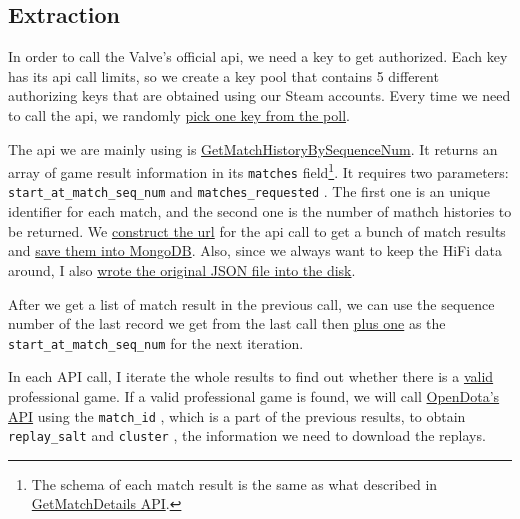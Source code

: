 \documentclass{article}
\newcommand{\codeinline}[1]{
    \texttt{#1}
}
\begin{document}
\subsection{Extraction}

In order to call the Valve's official api, we need a key to get authorized. Each key has its api call limits, so we create a key pool that contains 5 different authorizing keys that are obtained using our Steam accounts. Every time we need to call the api, we randomly \href{https://github.com/Vopaaz/big-data-psg-lgd/blob/a9a285e0e29c0d9e56b41994875df830c7e7b51b/src/main/java/FetchStore/ValveAPI.java#L215}{pick one key from the poll}.

The api we are mainly using is \href{https://wiki.teamfortress.com/wiki/WebAPI/GetMatchHistoryBySequenceNum}{GetMatchHistoryBySequenceNum}. It returns an array of game result information in its \codeinline{matches} field\footnote{The schema of each match result is the same as what described in \href{https://wiki.teamfortress.com/wiki/WebAPI/GetMatchDetails}{GetMatchDetails API}.}. It requires two parameters:\codeinline{start_at_match_seq_num} and \codeinline{matches_requested}.
The first one is an unique identifier for each match, and the second one is the number of mathch histories to be returned. We \href{https://github.com/Vopaaz/big-data-psg-lgd/blob/a9a285e0e29c0d9e56b41994875df830c7e7b51b/src/main/java/FetchStore/ValveAPI.java#L207-L230}{construct the url} for the api call to get a bunch of match results and \href{https://github.com/Vopaaz/big-data-psg-lgd/blob/a9a285e0e29c0d9e56b41994875df830c7e7b51b/src/main/java/FetchStore/ValveAPI.java#L238-L257}{save them into MongoDB}.
Also, since we always want to keep the HiFi data around, I also \href{https://github.com/Vopaaz/big-data-psg-lgd/blob/a9a285e0e29c0d9e56b41994875df830c7e7b51b/src/main/java/FetchStore/ValveAPI.java#L289-L300}{wrote the original JSON file into the disk}.

After we get a list of match result in the previous call, we can use the sequence number of the last record we get from the last call then \href{https://github.com/Vopaaz/big-data-psg-lgd/blob/a9a285e0e29c0d9e56b41994875df830c7e7b51b/src/main/java/FetchStore/ValveAPI.java#L275}{plus one} as the \codeinline{start_at_match_seq_num} for the next iteration.

In each API call, I iterate the whole results to find out whether there is a \href{https://github.com/Vopaaz/big-data-psg-lgd/blob/a9a285e0e29c0d9e56b41994875df830c7e7b51b/src/main/java/FetchStore/ValveAPI.java#L146-L161}{valid} professional game.
If a valid professional game is found, we will call \href{https://docs.opendota.com}{OpenDota's API} using the \codeinline{match_id}, which is a part of the previous results, to obtain \codeinline{replay_salt} and \codeinline{cluster}, the information we need to download the replays.
\end{document}
